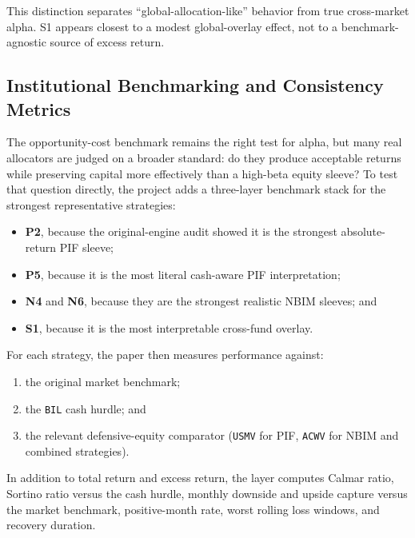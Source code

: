 \documentclass[conference]{IEEEtran}
\begin{document}
This distinction separates ``global-allocation-like'' behavior from true cross-market alpha. S1 appears closest to a modest global-overlay effect, not to a benchmark-agnostic source of excess return.

\subsection{Institutional Benchmarking and Consistency Metrics}

The opportunity-cost benchmark remains the right test for alpha, but many real allocators are judged on a broader standard: do they produce acceptable returns while preserving capital more effectively than a high-beta equity sleeve? To test that question directly, the project adds a three-layer benchmark stack for the strongest representative strategies:
\begin{itemize}[leftmargin=1.4em]
    \item \textbf{P2}, because the original-engine audit showed it is the strongest absolute-return PIF sleeve;
    \item \textbf{P5}, because it is the most literal cash-aware PIF interpretation;
    \item \textbf{N4} and \textbf{N6}, because they are the strongest realistic NBIM sleeves; and
    \item \textbf{S1}, because it is the most interpretable cross-fund overlay.
\end{itemize}

For each strategy, the paper then measures performance against:
\begin{enumerate}[leftmargin=1.4em]
    \item the original market benchmark;
    \item the \texttt{BIL} cash hurdle; and
    \item the relevant defensive-equity comparator (\texttt{USMV} for PIF, \texttt{ACWV} for NBIM and combined strategies).
\end{enumerate}

In addition to total return and excess return, the layer computes Calmar ratio, Sortino ratio versus the cash hurdle, monthly downside and upside capture versus the market benchmark, positive-month rate, worst rolling loss windows, and recovery duration.
\end{document}
